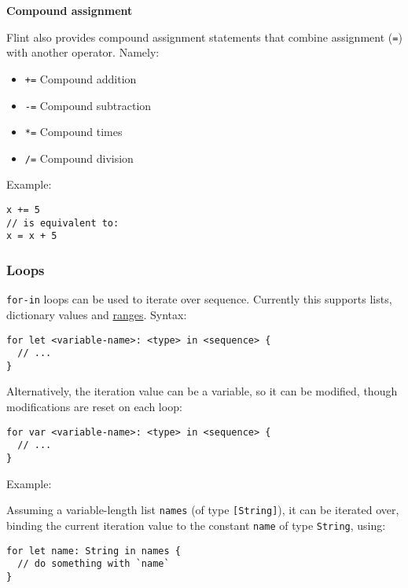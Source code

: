 \textbf{Compound assignment}
\label{sec:appendix-b-compound-assignment}

Flint also provides compound assignment statements that combine assignment (\texttt{=}) with another operator. Namely:

\begin{itemize}
	\item \texttt{+=} Compound addition
	\item \texttt{-=} Compound subtraction
	\item \texttt{*=} Compound times
	\item \texttt{/=} Compound division
\end{itemize}

Example:

\begin{verbatim}
x += 5
// is equivalent to:
x = x + 5
\end{verbatim}

\subsubsection{Loops}
\label{sec:appendix-b-loops}

\texttt{for-in} loops can be used to iterate over sequence. Currently this supports lists, dictionary values and \hyperref[sec:appendix-b-range-types]{ranges}. Syntax:

\begin{verbatim}
for let <variable-name>: <type> in <sequence> {
  // ...
}
\end{verbatim}

Alternatively, the iteration value can be a variable, so it can be modified, though modifications are reset on each loop:

\begin{verbatim}
for var <variable-name>: <type> in <sequence> {
  // ...
}
\end{verbatim}

Example:

Assuming a variable-length list \texttt{names} (of type \texttt{[String]}), it can be iterated over, binding the current iteration value to the constant \texttt{name} of type \texttt{String}, using:

\begin{verbatim}
for let name: String in names {
  // do something with `name`
}
\end{verbatim}

